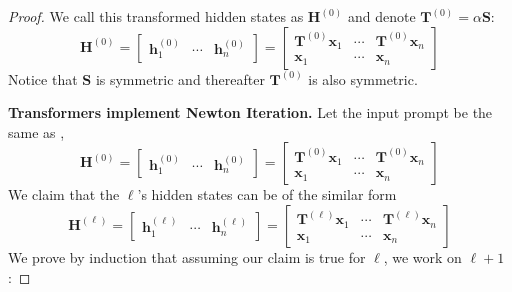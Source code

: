 \documentclass[11pt]{article}
\theoremstyle{plain}
\theoremstyle{definition}
\theoremstyle{remark}
\renewcommand{\^}[1]{^{(#1)}}
\newcommand{\bx}{\boldsymbol{x}}
\newcommand{\bh}{\boldsymbol{h}}
\newcommand{\bH}{\boldsymbol{H}}
\newcommand{\bS}{\boldsymbol{S}}
\newcommand{\bT}{\boldsymbol{T}}
\renewcommand{\paragraph}[1]{\vspace{1mm}\noindent\textbf{#1}}
\begin{document}
\begin{proof}
We call this transformed hidden states as $\bH^{(0)}$ and denote $\bT^{(0)} = \alpha \bS$:
\begin{equation}
        \bH^{(0)} = \begin{bmatrix}
            \bh_1^{(0)} & \cdots & \bh_n^{(0)}
        \end{bmatrix} = \begin{bmatrix}
            \bT^{(0)} \bx_1 & \cdots & \bT^{(0)} \bx_n \\
            \bx_1 & \cdots & \bx_n
        \end{bmatrix} 
\label{eqn:input_prompt}
\end{equation}
Notice that $\bS$ is symmetric and thereafter $\bT^{(0)}$ is also symmetric.

\paragraph{Transformers implement Newton Iteration.} 
Let the input prompt be the same as , 
    \begin{equation}
        \bH^{(0)} = \begin{bmatrix}
            \bh_1^{(0)} & \cdots & \bh_n^{(0)}
        \end{bmatrix} = \begin{bmatrix}
            \bT^{(0)} \bx_1 & \cdots & \bT^{(0)} \bx_n \\
            \bx_1 & \cdots & \bx_n
        \end{bmatrix} 
    \end{equation}
    We claim that the $\ell$'s hidden states can be of the similar form 
    \begin{equation}
        \bH^{(\ell)} = \begin{bmatrix}
            \bh_1^{(\ell)} & \cdots & \bh_n^{(\ell)}
        \end{bmatrix} = \begin{bmatrix}
            \bT^{(\ell)} \bx_1 & \cdots & \bT^{(\ell)} \bx_n \\
            \bx_1 & \cdots & \bx_n
        \end{bmatrix} 
    \end{equation}
    We prove by induction that assuming our claim is true for $\ell$, we work on $\ell + 1$:


\end{proof}
\end{document}
